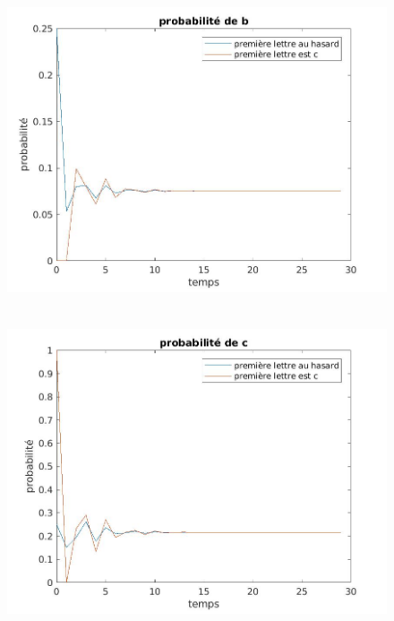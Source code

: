 \documentclass[11pt]{report}
\begin{document}
\begin{figure}[!h]
\begin{center}
\includegraphics[height = 9cm]{prob_b.jpg}
\caption{\label{prob_b}}
\end{center}
\end{figure}
\begin{figure}[!h]
\begin{center}
\includegraphics[height = 9cm]{prob_c.jpg}
\caption{\label{prob_c}}
\end{center}
\end{figure}
\end{document}

